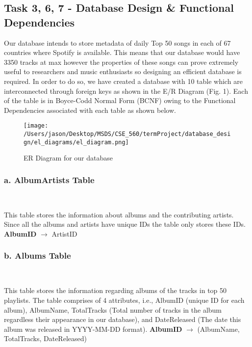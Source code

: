 \documentclass[conference]{IEEEtran}
\begin{document}
\subsection{\textbf{Task 3, 6, 7} - Database Design \& Functional Dependencies}

Our database intends to store metadata of daily Top 50 songs in each of 67 countries where Spotify is available. This means that our database would have 3350 tracks at max however the properties of these songs can prove extremely useful to researchers and music enthusiasts so designing an efficient database is required. In order to do so, we have created a database with 10 table which are interconnected through foreign keys as shown in the E/R Diagram (Fig. 1). Each of the table is in Boyce-Codd Normal Form (BCNF) owing to the Functional Dependencies associated with each table as shown below.  

\begin{figure*}
    \texttt{[image: /Users/jason/Desktop/MSDS/CSE\_560/termProject/database\_design/el\_diagrams/el\_diagram.png]}
    \caption{ER Diagram for our database}
    \label{Fig:ER Diagram}
\end{figure*}

\subsubsection*{a. \textbf{AlbumArtists} Table} \

This table stores the information about albums and the contributing artists. Since all the albums and artists have unique IDs the table only stores these IDs. \linebreak \linebreak
\textbf{AlbumID} $\to$ ArtistID \linebreak

\subsubsection*{b. \textbf{Albums} Table} \

This table stores the information regarding albums of the tracks in top 50 playlists. The table comprises of 4 attributes, i.e., AlbumID (unique ID for each album), AlbumName, TotalTracks (Total number of tracks in the album regardless their appearance in our database), and DateReleased (The date this album was released in YYYY-MM-DD format). \linebreak \linebreak
\textbf{AlbumID} $\to$ (AlbumName, TotalTracks, DateReleased) \linebreak
\end{document}
